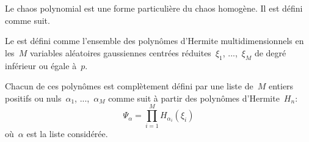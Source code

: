 \medskip
Le chaos polynomial est une forme particulière du chaos homogène. Il est défini comme suit.

\begin{definition}
Le  est défini comme l'ensemble des polynômes d'Hermite multidimensionnels en les~$M$ variables aléatoires gaussiennes centrées réduites~$\xi_1$, ...,~$\xi_M$ de degré inférieur ou égale à~$p$.

Chacun de ces polynômes est complètement défini par une liste de~$M$ entiers positifs ou nuls~$\alpha_1$, ...,~$\alpha_M$ comme suit à partir des polynômes d'Hermite~$H_n$:
\begin{equation}
\Psi_\alpha = \prod_{i=1}^M H_{\alpha_i}(\xi_i)
\end{equation}
où~$\alpha$ est la liste considérée.
\end{definition}


